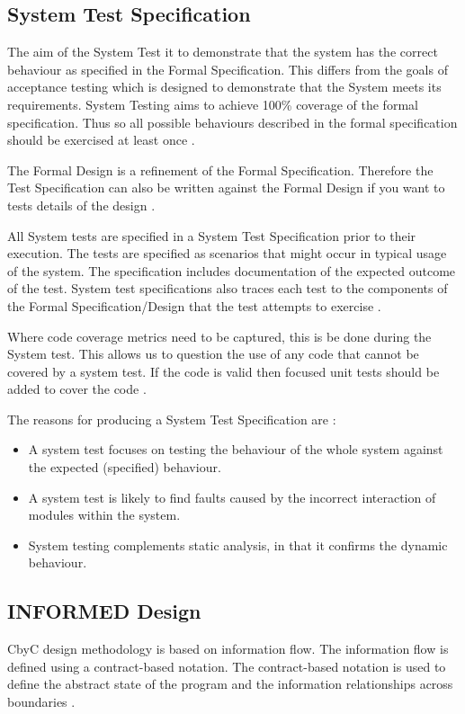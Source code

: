 \subsection{System Test Specification}

The aim of the System Test it to demonstrate that the system has the correct 
behaviour as specified in the Formal Specification. This differs from the goals of
acceptance testing which is designed to demonstrate that the System meets
its requirements. System Testing aims to achieve 100\% coverage of the formal 
specification. Thus so all possible behaviours described in the formal specification
should be exercised at least once \parencite{Tokeneer}.

The Formal Design is a refinement of the Formal Specification. Therefore the Test
Specification can also be written against the Formal Design if you want to tests 
details of the design \parencite{Tokeneer}.

All System tests are specified in a System Test Specification prior to their 
execution.  The tests are specified as scenarios that might occur in typical usage
of the system. The specification includes documentation of the expected outcome
of the test. System test specifications also traces each test to the components
of the Formal Specification/Design that the test attempts to exercise \parencite{Tokeneer}.

Where code coverage metrics need to be captured, this is be done during the
System test. This allows us to question the use of any code that cannot be covered
by a system test. If the code is valid then focused unit tests should be added to
cover the code \parencite{Tokeneer}.

The reasons for producing a System Test Specification are \parencite{Tokeneer}:
\begin{itemize}
	\item A system test focuses on testing the behaviour of the whole system against
		the expected (specified) behaviour.
	\item A system test is likely to find faults caused by the incorrect interaction
		of modules within the system.
	\item System testing complements static analysis, in that it confirms the 
		dynamic behaviour.
\end{itemize}

\subsection{INFORMED Design}
CbyC design methodology is based on information flow. The information flow is 
defined using a contract-based notation. The contract-based notation is used to
define the abstract state of the program and the information relationships across
boundaries \parencite{CbyCMan}.

